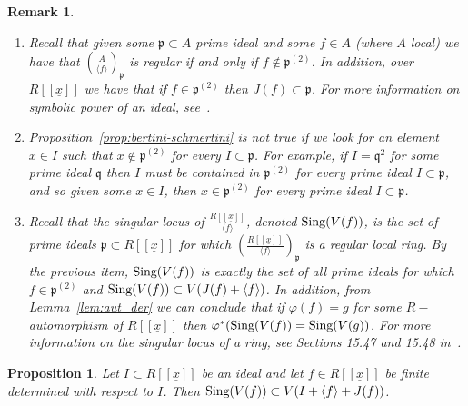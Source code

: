 \documentclass{article}
\newtheorem{proposition}[theorem]{Proposition}
\newtheorem{remark}[theorem]{Remark}
\numberwithin{theorem}{section}
\begin{document}
\begin{remark}\label{rem:symbolicpower}
\begin{enumerate}
    \item \textup{Recall that given some $\mathfrak{p} \subset A$ prime ideal and some $f \in A$ (where $A$ local) we have that $\left( \frac{A}{\langle f \rangle} \right)_\mathfrak{p}$ is regular if and only if $f \notin \mathfrak{p}^{(2)}$. In addition, over $R[[\underline{x}]]$ we have that if $f \in \mathfrak{p}^{(2)}$ then $J(f) \subset \mathfrak{p}$.  For more information on symbolic power of an ideal, see~\cite{dao2015symbolic}. }
    \item \textup{Proposition~\ref{prop:bertini-schmertini} is not true if we look for an element $x \in I$ such that $x \notin \mathfrak{p}^{(2)}$ for every $I \subset \mathfrak{p}$. For example, if $I = \mathfrak{q}^2$ for some prime ideal $\mathfrak{q}$ then $I$ must be contained in $\mathfrak{p}^{(2)}$ for every prime ideal $I \subset \mathfrak{p}$, and so given some $x \in I$, then $x \in \mathfrak{p}^{(2)}$ for every prime ideal $I \subset \mathfrak{p}$.}
    \item \textup{Recall that the singular locus of $\frac{R[[\underline{x}]]}{\langle f \rangle}$, denoted $\textup{Sing}(V(f))$, is the set of prime ideals $\mathfrak{p} \subset R[[\underline{x}]]$ for which $\left( \frac{R[[\underline{x}]]}{\langle f \rangle}\right)_{\mathfrak{p}}$ is a regular local ring. By the previous item, $\textup{Sing}(V(f))$ is exactly the set of all prime ideals for which $f \in \mathfrak{p}^{(2)}$ and $\textup{Sing}(V(f)) \subset V(J(f) + \langle f \rangle)$. In addition, from Lemma~\ref{lem:aut_der} we can conclude that if $\varphi(f)=g$ for some $R-$automorphism of $R[[\underline{x}]]$ then $\varphi^*(\textup{Sing}(V(f))=\textup{Sing}(V(g))$. For more information on the singular locus of a ring, see Sections 15.47 and 15.48 in~\cite{stacks-project}.}
\end{enumerate}
\end{remark}



\begin{proposition}\label{prop:det_other_direction}
    Let $I \subset R[[\underline{x}]]$ be an ideal and let $f \in R[[\underline{x}]]$ be finite determined with respect to $I$. Then $\textup{Sing}(V(f)) \subset V(I + \langle f \rangle + J(f))$.
\end{proposition}
\end{document}
